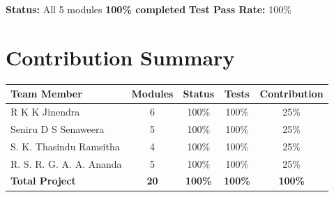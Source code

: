 \documentclass[11pt, a4paper]{article}
\begin{document}
\textbf{Status:} All 5 modules \textbf{100\% completed} \quad \textbf{Test Pass Rate:} 100\%

\vspace{0.2cm}

\section*{Contribution Summary}

\begin{table}[h]
\centering
\small
\renewcommand{\arraystretch}{1.3}
\begin{tabularx}{\textwidth}{l c c c c}
\toprule
\rowcolor{themelightblue}
\textbf{Team Member} & \textbf{Modules} & \textbf{Status} & \textbf{Tests} & \textbf{Contribution} \\
\midrule
R K K Jinendra & 6 & 100\% & 100\% & 25\% \\
Seniru D S Senaweera & 5 & 100\% & 100\% & 25\% \\
S. K. Thasindu Ramsitha & 4 & 100\% & 100\% & 25\% \\
R. S. R. G. A. A. Ananda & 5 & 100\% & 100\% & 25\% \\
\midrule
\rowcolor{themelightblue}
\textbf{Total Project} & \textbf{20} & \textbf{100\%} & \textbf{100\%} & \textbf{100\%} \\
\bottomrule
\end{tabularx}
\end{table}
\end{document}
